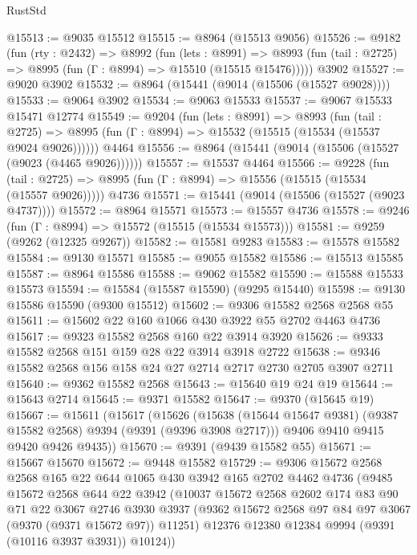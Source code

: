 \begin{lexlean}{RustStd}
\begin{coremodule}
@15513 := @9035 @15512
@15515 := @8964 (@15513 @9056)
@15526 := @9182
    (fun (rty : @2432) =>
    @8992
      (fun (lets : @8991) =>
      @8993 (fun (tail : @2725) => @8995 (fun (Γ : @8994) => @15510 (@15515 @15476)))))
    @3902
@15527 := @9020 @3902
@15532 := @8964 (@15441 (@9014 (@15506 (@15527 @9028))))
@15533 := @9064 @3902
@15534 := @9063 @15533
@15537 := @9067 @15533 @15471 @12774
@15549 := @9204
    (fun (lets : @8991) =>
    @8993
      (fun (tail : @2725) =>
      @8995 (fun (Γ : @8994) => @15532 (@15515 (@15534 (@15537 @9024 @9026))))))
    @4464
@15556 := @8964 (@15441 (@9014 (@15506 (@15527 (@9023 (@4465 @9026))))))
@15557 := @15537 @4464
@15566 := @9228
    (fun (tail : @2725) => @8995 (fun (Γ : @8994) => @15556 (@15515 (@15534 (@15557 @9026)))))
    @4736
@15571 := @15441 (@9014 (@15506 (@15527 (@9023 @4737))))
@15572 := @8964 @15571
@15573 := @15557 @4736
@15578 := @9246 (fun (Γ : @8994) => @15572 (@15515 (@15534 @15573)))
@15581 := @9259 (@9262 (@12325 @9267))
@15582 := @15581 @9283
@15583 := @15578 @15582
@15584 := @9130 @15571
@15585 := @9055 @15582
@15586 := @15513 @15585
@15587 := @8964 @15586
@15588 := @9062 @15582
@15590 := @15588 @15533 @15573
@15594 := @15584 (@15587 @15590) (@9295 @15440)
@15598 := @9130 @15586 @15590 (@9300 @15512)
@15602 := @9306 @15582 @2568 @2568 @55
@15611 := @15602 @22 @160 @1066 @430 @3922 @55 @2702 @4463 @4736
@15617 := @9323 @15582 @2568 @160 @22 @3914 @3920
@15626 := @9333 @15582 @2568 @151 @159 @28 @22 @3914 @3918 @2722
@15638 := @9346 @15582 @2568 @156 @158 @24 @27 @2714 @2717 @2730 @2705 @3907 @2711
@15640 := @9362 @15582 @2568
@15643 := @15640 @19 @24 @19
@15644 := @15643 @2714
@15645 := @9371 @15582
@15647 := @9370 (@15645 @19)
@15667 := @15611
    (@15617
      (@15626
        (@15638 (@15644 @15647 @9381) (@9387 @15582 @2568) @9394 (@9391 (@9396 @3908 @2717)))
        @9406
        @9410
        @9415
        @9420
        @9426
        @9435))
@15670 := @9391 (@9439 @15582 @55)
@15671 := @15667 @15670
@15672 := @9448 @15582
@15729 := @9306
    @15672
    @2568
    @2568
    @165
    @22
    @644
    @1065
    @430
    @3942
    @165
    @2702
    @4462
    @4736
    (@9485
      @15672
      @2568
      @644
      @22
      @3942
      (@10037
        @15672
        @2568
        @2602
        @174
        @83
        @90
        @71
        @22
        @3067
        @2746
        @3930
        @3937
        (@9362 @15672 @2568 @97 @84 @97 @3067 (@9370 (@9371 @15672 @97)) @11251)
        @12376
        @12380
        @12384
        @9994
        (@9391 (@10116 @3937 @3931))
        @10124))

\end{coremodule}
\end{lexlean}
